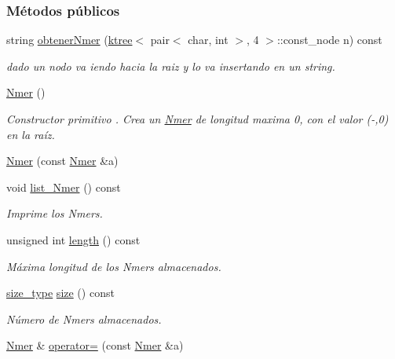 \subsubsection*{Métodos públicos}
\begin{DoxyCompactItemize}
\item 
string \hyperlink{classNmer_a3052308309341026c76b16c097e3981d}{obtener\+Nmer} (\hyperlink{classktree}{ktree}$<$ pair$<$ char, int $>$, 4 $>$\+::const\+\_\+node n) const 
\begin{DoxyCompactList}\small\item\em dado un nodo va iendo hacia la raiz y lo va insertando en un string. \end{DoxyCompactList}\item 
\hyperlink{classNmer_ac2a651dd05b03e716b877c26386d772e}{Nmer} ()
\begin{DoxyCompactList}\small\item\em Constructor primitivo . Crea un \hyperlink{classNmer}{Nmer} de longitud maxima 0, con el valor (\textquotesingle{}-\/\textquotesingle{},0) en la raíz. \end{DoxyCompactList}\item 
\hyperlink{classNmer_aa15e62b748a55aec2f43f65497fc2a5e}{Nmer} (const \hyperlink{classNmer}{Nmer} \&a)
\item 
void \hyperlink{classNmer_a1ce1c0cb174d94685c7234f58f9dc119}{list\+\_\+\+Nmer} () const 
\begin{DoxyCompactList}\small\item\em Imprime los Nmers. \end{DoxyCompactList}\item 
unsigned int \hyperlink{classNmer_a60e2335600c01ee39e865790015818f0}{length} () const 
\begin{DoxyCompactList}\small\item\em Máxima longitud de los Nmers almacenados. \end{DoxyCompactList}\item 
\hyperlink{classNmer_a1b8892df885de3ac91edf3abd8f1b55d}{size\+\_\+type} \hyperlink{classNmer_accdea65838fcd53c48a2d05f6809643f}{size} () const 
\begin{DoxyCompactList}\small\item\em Número de Nmers almacenados. \end{DoxyCompactList}\item 
\hyperlink{classNmer}{Nmer} \& \hyperlink{classNmer_a129843cfe04a63a199ac641117c052cc}{operator=} (const \hyperlink{classNmer}{Nmer} \&a)
\item 

\end{DoxyCompactItemize}
